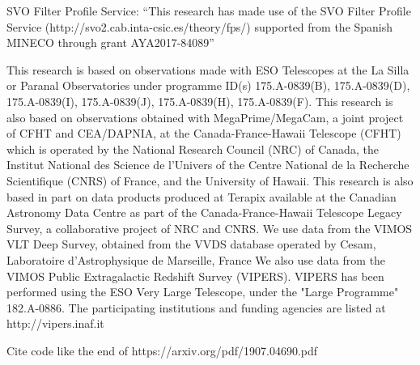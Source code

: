 
SVO Filter Profile Service: ``This research has made use of the SVO Filter Profile Service (http://svo2.cab.inta-csic.es/theory/fps/) supported from the Spanish MINECO through grant AYA2017-84089''

This research is based on observations made with ESO Telescopes at the La Silla or Paranal Observatories under programme ID(s) 175.A-0839(B), 175.A-0839(D), 175.A-0839(I), 175.A-0839(J), 175.A-0839(H), 175.A-0839(F).
This research is also based on observations obtained with MegaPrime/MegaCam, a joint project of CFHT and CEA/DAPNIA, at the Canada-France-Hawaii Telescope (CFHT) which is operated by the National Research Council (NRC) of Canada, the Institut National des Science de l'Univers of the Centre National de la Recherche Scientifique (CNRS) of France, and the University of Hawaii.
This research is also based in part on data products produced at Terapix available at the Canadian Astronomy Data Centre as part of the Canada-France-Hawaii Telescope Legacy Survey, a collaborative project of NRC and CNRS.
We use data from the VIMOS VLT Deep Survey, obtained from the VVDS database operated by Cesam, Laboratoire d'Astrophysique de Marseille, France
We also use data from the VIMOS Public Extragalactic Redshift Survey (VIPERS).
VIPERS has been performed using the ESO Very Large Telescope, under the "Large Programme" 182.A-0886. 
The participating institutions and funding agencies are listed at http://vipers.inaf.it


Cite code like the end of https://arxiv.org/pdf/1907.04690.pdf